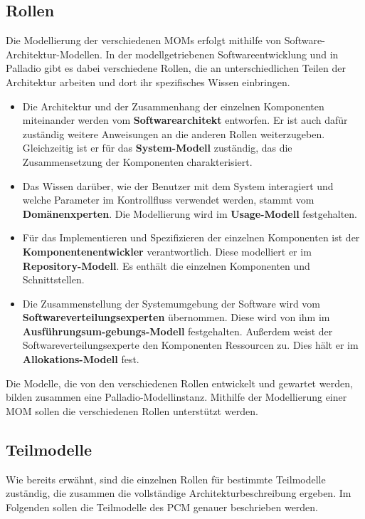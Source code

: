 \subsection{Rollen}
Die Modellierung der verschiedenen MOMs erfolgt mithilfe von Software-Architektur-Modellen. In der modellgetriebenen Softwareentwicklung und in Palladio gibt es dabei verschiedene Rollen, die an unterschiedlichen Teilen der Architektur arbeiten und dort ihr spezifisches Wissen einbringen.
\begin{itemize}
\item Die Architektur und der Zusammenhang der einzelnen Komponenten
miteinander werden vom \textbf{Softwarearchitekt} entworfen. Er ist auch dafür
zuständig weitere Anweisungen an die anderen Rollen weiterzugeben. Gleichzeitig ist er für das \textbf{System-Modell} zuständig, das die Zusammensetzung der Komponenten charakterisiert.
\item Das Wissen darüber, wie der Benutzer mit dem System interagiert
und welche Parameter im Kontrollfluss verwendet werden, stammt vom \textbf{Domänenxperten}. Die Modellierung wird im \textbf{Usage-Modell} festgehalten.
\item Für das Implementieren und Spezifizieren der einzelnen
Komponenten ist der \textbf{Komponentenentwickler} verantwortlich. Diese modelliert er im \textbf{Repository-Modell}. Es enthält die einzelnen Komponenten und Schnittstellen.
\item Die Zusammenstellung der Systemumgebung der Software wird vom \textbf{Softwareverteilungsexperten} übernommen. Diese wird von ihm im \textbf{Ausführungsum-gebungs-Modell} festgehalten. Außerdem weist der Softwareverteilungsexperte den Komponenten Ressourcen zu. Dies hält er im \textbf{Allokations-Modell} fest.
\end{itemize}
Die Modelle, die von den verschiedenen Rollen entwickelt und gewartet werden, bilden zusammen eine Palladio-Modellinstanz. Mithilfe der Modellierung einer MOM sollen die verschiedenen Rollen unterstützt werden. 

\subsection{Teilmodelle}
Wie bereits erwähnt, sind die einzelnen Rollen für bestimmte Teilmodelle zuständig, die zusammen die vollständige Architekturbeschreibung ergeben. Im Folgenden sollen die Teilmodelle des PCM genauer beschrieben werden.
